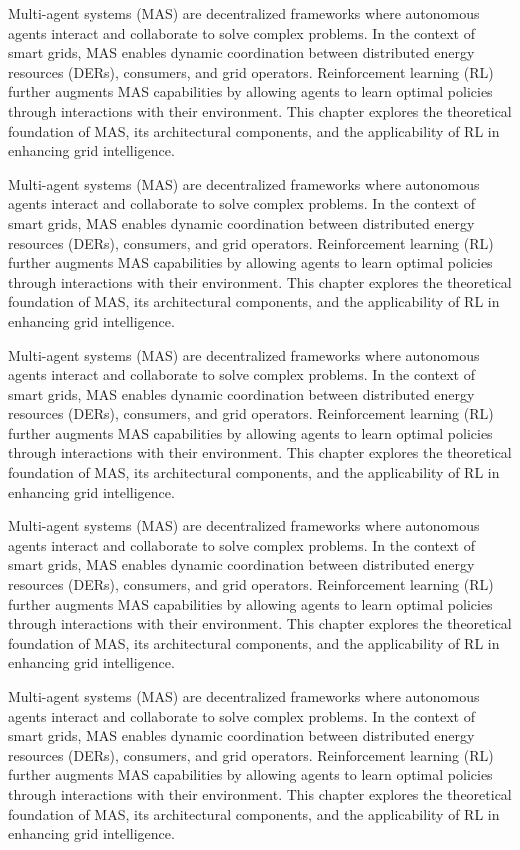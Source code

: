 Multi-agent systems (MAS) are decentralized frameworks where autonomous agents interact and collaborate to solve complex problems. 
In the context of smart grids, MAS enables dynamic coordination between distributed energy resources (DERs), consumers, and grid operators. 
Reinforcement learning (RL) further augments MAS capabilities by allowing agents to learn optimal policies through interactions with their environment. 
This chapter explores the theoretical foundation of MAS, its architectural components, and the applicability of RL in enhancing grid intelligence.

Multi-agent systems (MAS) are decentralized frameworks where autonomous agents interact and collaborate to solve complex problems. 
In the context of smart grids, MAS enables dynamic coordination between distributed energy resources (DERs), consumers, and grid operators. 
Reinforcement learning (RL) further augments MAS capabilities by allowing agents to learn optimal policies through interactions with their environment. 
This chapter explores the theoretical foundation of MAS, its architectural components, and the applicability of RL in enhancing grid intelligence.

Multi-agent systems (MAS) are decentralized frameworks where autonomous agents interact and collaborate to solve complex problems. 
In the context of smart grids, MAS enables dynamic coordination between distributed energy resources (DERs), consumers, and grid operators. 
Reinforcement learning (RL) further augments MAS capabilities by allowing agents to learn optimal policies through interactions with their environment. 
This chapter explores the theoretical foundation of MAS, its architectural components, and the applicability of RL in enhancing grid intelligence.

Multi-agent systems (MAS) are decentralized frameworks where autonomous agents interact and collaborate to solve complex problems. 
In the context of smart grids, MAS enables dynamic coordination between distributed energy resources (DERs), consumers, and grid operators. 
Reinforcement learning (RL) further augments MAS capabilities by allowing agents to learn optimal policies through interactions with their environment. 
This chapter explores the theoretical foundation of MAS, its architectural components, and the applicability of RL in enhancing grid intelligence.

Multi-agent systems (MAS) are decentralized frameworks where autonomous agents interact and collaborate to solve complex problems. 
In the context of smart grids, MAS enables dynamic coordination between distributed energy resources (DERs), consumers, and grid operators. 
Reinforcement learning (RL) further augments MAS capabilities by allowing agents to learn optimal policies through interactions with their environment. 
This chapter explores the theoretical foundation of MAS, its architectural components, and the applicability of RL in enhancing grid intelligence.

